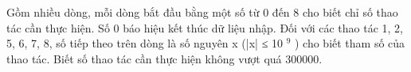 Gồm nhiều dòng, mỗi dòng bắt đầu bằng một số từ 0 đến 8 cho biết chỉ số thao tác cần thực hiện. Số 0 báo hiệu kết thúc dữ liệu nhập. Đối với các thao tác 1, 2, 5, 6, 7, 8, số tiếp theo trên dòng là số nguyên x (|x| ≤ 10   $^    9   $   ) cho biết tham số của thao tác. Biết số thao tác cần thực hiện không vượt quá 300000.